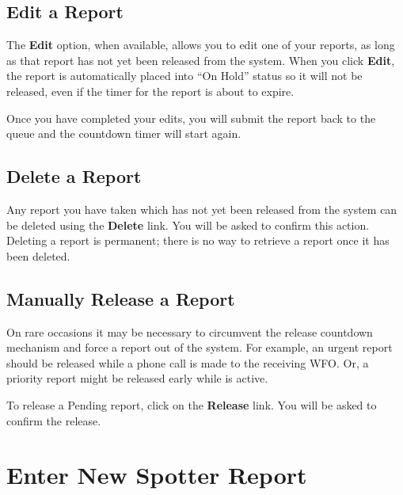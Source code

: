 \documentclass[pdflatex,letterpaper,twoside,12pt]{book}
\begin{document}
\subsection{Edit a Report}

The \textbf{Edit} option, when available, allows you to edit one of your reports, as long as that report has not yet been released from the system.  When you click \textbf{Edit}, the report is automatically placed into ``On Hold'' status so it will not be released, even if the timer for the report is about to expire.

Once you have completed your edits, you will submit the report back to the queue and the countdown timer will start again.

\subsection{Delete a Report}

Any report you have taken which has not yet been released from the system can be deleted using the \textbf{Delete} link.  You will be asked to confirm this action.  Deleting a report is permanent;  there is no way to retrieve a report once it has been deleted.

\subsection{Manually Release a Report}\label{manual-release}

On rare occasions it may be necessary to circumvent the release countdown mechanism and force a report out of the system.  For example, an urgent report should be released while a phone call is made to the receiving WFO.  Or, a priority report might be released early while  is active.

To release a Pending report, click on the \textbf{Release} link.  You will be asked to confirm the release.



\section{Enter New Spotter Report}\label{dash-new-report}
\end{document}
